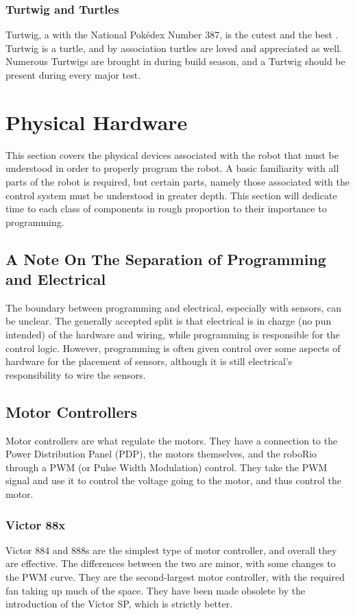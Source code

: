 \documentclass[]{report}
\begin{document}
\subsection{Turtwig and Turtles}
Turtwig, a \pokemon{} with the National Pok\'edex Number 387, is the cutest and the best \pokemon.
Turtwig is a turtle, and by association turtles are loved and appreciated as well.
Numerous Turtwigs are brought in during build season, and a Turtwig should be present during every major test.



\chapter{Physical Hardware}
	This section covers the physical devices associated with the robot that must be understood in order to properly program the robot.
	A basic familiarity with all parts of the robot is required, but certain parts, namely those associated with the control system must be understood in greater depth.
	This section will dedicate time to each class of components in rough proportion to their importance to programming.
\section{A Note On The Separation of Programming and Electrical}
	The boundary between programming and electrical, especially with sensors, can be unclear.
	The generally accepted split is that electrical is in charge (no pun intended) of the hardware and wiring, while programming is responsible for the control logic.
	However, programming is often given control over some aspects of hardware for the placement of sensors, although it is still electrical's responsibility to wire the sensors.
\section{Motor Controllers}
	Motor controllers are what regulate the motors.
	They have a connection to the Power Distribution Panel (PDP), the motors themselves, and the roboRio through a PWM (or Pulse Width Modulation) control.
	They take the PWM signal and use it to control the voltage going to the motor, and thus control the motor.
\subsection{Victor 88x}
	Victor 884 and 888s are the simplest type of motor controller, and overall they are effective.
	The differences between the two are minor, with some changes to the PWM curve.
	They are the second-largest motor controller, with the required fan taking up much of the space.
	They have been made obsolete by the introduction of the Victor SP, which is strictly better.
\end{document}
